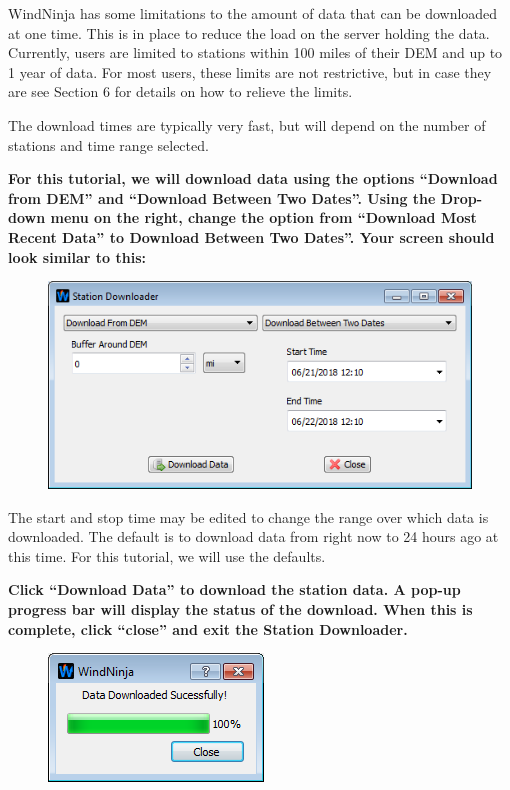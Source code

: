 \documentclass[12pt]{article}
\begin{document}
WindNinja has some limitations to the amount of data that can be downloaded at one time.  This is in place to reduce the load on the server holding the data.  Currently, users are limited to stations within 100 miles of their DEM and up to 1 year of data.  For most users, these limits are not restrictive, but in case they are see Section 6 for details on how to relieve the limits.

The download times are typically very fast, but will depend on the number of stations and time range selected.

\textbf{\color{red}For this tutorial, we will download data using the options “Download from DEM” and “Download Between Two Dates”. Using the Drop-down menu on the right, change the option from “Download Most Recent Data” to Download Between Two Dates”. Your screen should look similar to this:}

\begin{figure}[H]
	\centering
	\label{}
	\includegraphics[scale=1.0]{SF-1-2}
\end{figure}

The start and stop time may be edited to change the range over which data is downloaded. The default is to download data from right now to 24 hours ago at this time.  For this tutorial, we will use the defaults.

\textbf{\color{red}Click “Download Data” to download the station data. A pop-up progress bar will display the status of the download. When this is complete, click “close” and exit the Station Downloader.}

\begin{figure}[H]
	\centering
	\label{}
	\includegraphics[scale=1.0]{Download-3}
\end{figure}
\end{document}
